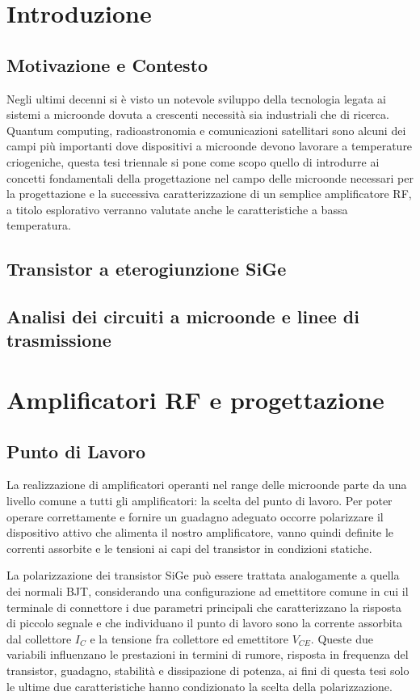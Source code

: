 \documentclass[12pt]{article}
\begin{document}
\section{Introduzione}
\subsection{Motivazione e Contesto}
Negli ultimi decenni si è visto un notevole sviluppo della tecnologia legata ai sistemi a microonde dovuta a crescenti necessità sia industriali che di ricerca.
Quantum computing, radioastronomia e comunicazioni satellitari sono alcuni dei campi più importanti dove dispositivi a microonde devono lavorare a temperature
criogeniche, questa tesi triennale si pone come scopo quello di introdurre ai concetti fondamentali della progettazione nel campo delle microonde necessari per
la progettazione e la successiva caratterizzazione di un semplice amplificatore RF, a titolo esplorativo verranno valutate anche le caratteristiche a bassa
temperatura.

\subsection{Transistor a eterogiunzione SiGe}
\subsection{Analisi dei circuiti a microonde e linee di trasmissione}
\section{Amplificatori RF e progettazione}

\subsection{Punto di Lavoro}
\label{sub_q_point}
La realizzazione di amplificatori operanti nel range delle microonde parte da una livello comune a tutti gli amplificatori: la scelta del punto di lavoro. Per poter operare correttamente e fornire un guadagno adeguato occorre polarizzare il dispositivo attivo che alimenta il nostro amplificatore, vanno quindi definite le correnti assorbite e le tensioni ai capi del transistor in condizioni statiche.

La polarizzazione dei transistor SiGe può essere trattata analogamente a quella dei normali BJT, considerando una configurazione ad emettitore comune in cui il terminale di connettore i due parametri principali che caratterizzano la risposta di piccolo segnale e che individuano il punto di lavoro sono la corrente assorbita dal collettore $I_C$ e la tensione fra collettore ed emettitore $V_{CE}$. Queste due variabili influenzano le prestazioni in termini di rumore, risposta in frequenza del transistor, guadagno, stabilità e dissipazione di potenza, ai fini di questa tesi solo le ultime due caratteristiche hanno condizionato la scelta della polarizzazione.
\end{document}
